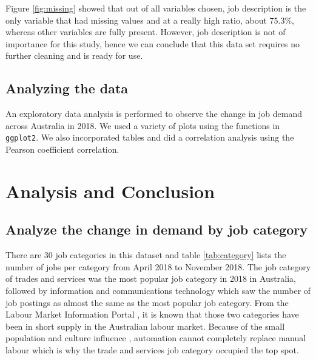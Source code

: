 \documentclass[11pt,a4paper,]{article}
\begin{document}
Figure \ref{fig:missing} showed that out of all variables chosen, job description is the only variable that had missing values and at a really high ratio, about 75.3\%, whereas other variables are fully present. However, job description is not of importance for this study, hence we can conclude that this data set requires no further cleaning and is ready for use.

\hypertarget{analyzing-the-data}{%
\subsection{Analyzing the data}\label{analyzing-the-data}}

An exploratory data analysis is performed to observe the change in job demand across Australia in 2018. We used a variety of plots using the functions in \texttt{ggplot2}. We also incorporated tables and did a correlation analysis using the Pearson coefficient correlation.

\hypertarget{analysis-and-conclusion}{%
\section{Analysis and Conclusion}\label{analysis-and-conclusion}}

\hypertarget{analyze-the-change-in-demand-by-job-category}{%
\subsection{Analyze the change in demand by job category}\label{analyze-the-change-in-demand-by-job-category}}

There are 30 job categories in this dataset and table \ref{tab:category} lists the number of jobs per category from April 2018 to November 2018. The job category of trades and services was the most popular job category in 2018 in Australia, followed by information and communications technology which saw the number of job postings as almost the same as the most popular job category. From the Labour Market Information Portal \autocite{welcome}, it is known that those two categories have been in short supply in the Australian labour market. Because of the small population and culture influence \autocite{burgess_2018}, automation cannot completely replace manual labour which is why the trade and services job category occupied the top spot.
\end{document}
